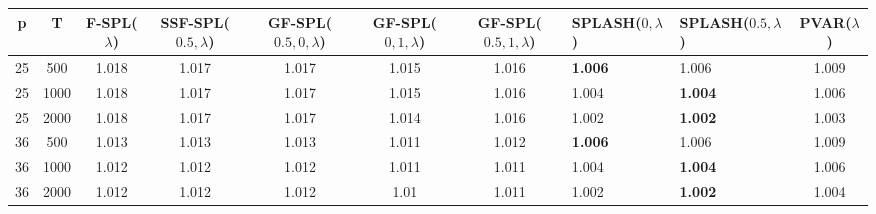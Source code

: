 \begin{tabular}{cccccccllc}
\hline
  p  &  T   &  F-SPL($\lambda$)  &  SSF-SPL($0.5, \lambda$)  &  GF-SPL($0.5, 0, \lambda$)  &  GF-SPL($0, 1, \lambda$)  &  GF-SPL($0.5, 1, \lambda$)  & SPLASH($0, \lambda$)   & SPLASH($0.5, \lambda$)   &  PVAR($\lambda$)  \\
\hline
 25  & 500  &       1.018        &           1.017           &            1.017            &           1.015           &            1.016            & \textbf{1.006}         & 1.006                    &       1.009       \\
 25  & 1000 &       1.018        &           1.017           &            1.017            &           1.015           &            1.016            & 1.004                  & \textbf{1.004}           &       1.006       \\
 25  & 2000 &       1.018        &           1.017           &            1.017            &           1.014           &            1.016            & 1.002                  & \textbf{1.002}           &       1.003       \\
 36  & 500  &       1.013        &           1.013           &            1.013            &           1.011           &            1.012            & \textbf{1.006}         & 1.006                    &       1.009       \\
 36  & 1000 &       1.012        &           1.012           &            1.012            &           1.011           &            1.011            & 1.004                  & \textbf{1.004}           &       1.006       \\
 36  & 2000 &       1.012        &           1.012           &            1.012            &           1.01            &            1.011            & 1.002                  & \textbf{1.002}           &       1.004       \\
\hline
\end{tabular}
